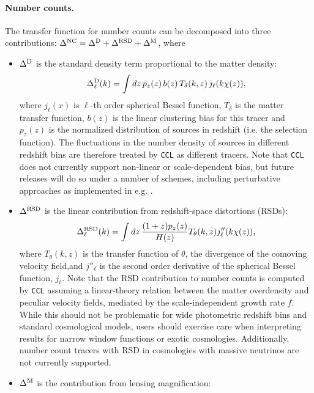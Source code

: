 \documentclass[\docopts]{\docclass}
\newcommand{\ccl}{{\tt CCL}\xspace}
\begin{document}
\paragraph{\bf Number counts.} The transfer function for number counts can be decomposed into three contributions: $\Delta^{\rm NC}=\Delta^{\rm D}+\Delta^{\rm RSD}+\Delta^{\rm M}$, where
\begin{itemize}
  \item $\Delta^{\rm D}$ is the standard density term proportional to the matter density:
        \begin{equation}\label{eq:transfer_nc}
          \Delta^{\rm D}_\ell(k)=\int dz\,p_z(z)\,b(z)\,T_\delta(k,z)\,j_\ell(k\chi(z)),
        \end{equation}
        where $j_\ell(x)$ is $\ell$-th order spherical Bessel function, $T_\delta$ is the matter transfer function, $b(z)$ is the linear clustering bias for this tracer and $p_z(z)$ is the normalized distribution of sources in redshift (i.e. the selection function). The fluctuations in the number density of sources in different redshift bins are therefore treated by \ccl as different tracers. Note that \ccl does not currently support non-linear or scale-dependent bias, but future releases will do so under a number of schemes, including perturbative approaches as implemented in e.g. \cite{FASTPT}.
  \item $\Delta^{\rm RSD}$ is the linear contribution from redshift-space distortions (RSDs):
        \begin{equation}\label{eq:transfer_rsd}
          \Delta^{\rm RSD}_\ell(k)=\int dz\,\frac{(1+z) p_z(z)}{H(z)}T_\theta(k,z) j_\ell''(k\chi(z)),
        \end{equation}
        where $T_\theta(k,z)$ is the transfer function of $\theta$, the divergence of the comoving velocity field,and $j''_\ell$ is the second order derivative of the spherical Bessel function, $j_\ell$. Note that the RSD contribution to number counts is computed by \ccl assuming a linear-theory relation between the matter overdensity and peculiar velocity fields, mediated by the scale-independent growth rate $f$. While this should not be problematic for wide photometric redshift bins and standard cosmological models, users should exercise care when interpreting results for narrow window functions or exotic cosmologies. Additionally, number count tracers with RSD in cosmologies with massive neutrinos are not currently supported.
  \item $\Delta^{\rm M}$ is the contribution from lensing magnification:

\end{itemize}
\end{document}
